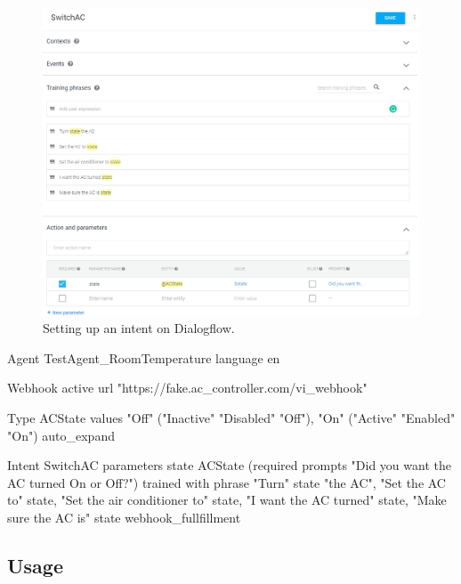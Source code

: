 \begin{figure}[!htb]
    \centering
    \includegraphics[width=1\textwidth]{Thesis_Images/CreateIntent.PNG}
    \caption{Setting up an intent on Dialogflow.}
        \label{CreateIntent}
\end{figure}
\begin{samepage}
    \begin{DSL}
        Agent TestAgent_RoomTemperature
            language en 
                
            Webhook 
                active 
                url "https://fake.ac_controller.com/vi_webhook"

            Type ACState
                values 
                    "Off" ("Inactive" "Disabled" "Off"),
                    "On" ("Active" "Enabled" "On")
                auto_expand

            Intent SwitchAC
                parameters
                    state ACState (required prompts 
                        "Did you want the AC turned On or Off?")
                trained with phrase
                    "Turn" state "the AC",
                    "Set the AC to" state,
                    "Set the air conditioner to" state,
                    "I want the AC turned" state,
                    "Make sure the AC is" state
                webhook_fullfillment
    \end{DSL}
\end{samepage}

\subsection{Usage}

